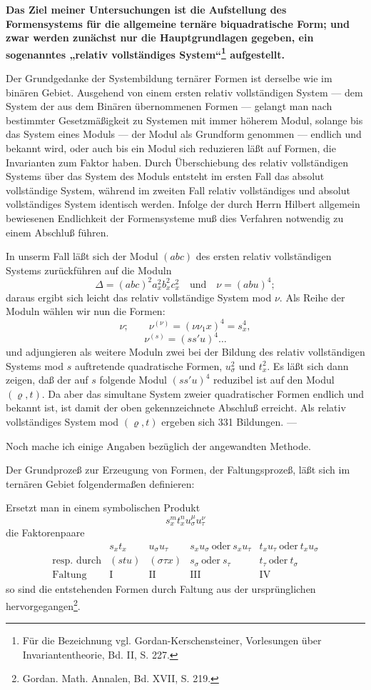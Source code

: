 \documentclass[11pt]{article}
\begin{document}
\textbf{Das Ziel meiner Untersuchungen ist die Aufstellung des Formensystems für die allgemeine ternäre biquadratische Form; und zwar werden zunächst nur die Hauptgrundlagen gegeben, ein sogenanntes „relativ vollständiges System“\footnote{Für die Bezeichnung vgl. Gordan-Kerschensteiner, Vorlesungen über Invariantentheorie, Bd. II, S. 227.} aufgestellt.}

Der Grundgedanke der Systembildung ternärer Formen ist derselbe wie im binären Gebiet. Ausgehend von einem ersten relativ vollständigen System --- dem System der aus dem Binären übernommenen Formen --- gelangt man nach bestimmter Gesetzmäßigkeit zu Systemen mit immer höherem Modul, solange bis das System eines Moduls --- der Modul als Grundform genommen --- endlich und bekannt wird, oder auch bis ein Modul sich reduzieren läßt auf Formen, die Invarianten zum Faktor haben. Durch Überschiebung des relativ vollständigen Systems über das System des Moduls entsteht im ersten Fall das absolut vollständige System, während im zweiten Fall relativ vollständiges und absolut vollständiges System identisch werden. Infolge der durch Herrn Hilbert allgemein bewiesenen Endlichkeit der Formensysteme muß dies Verfahren notwendig zu einem Abschluß führen.

In unserm Fall läßt sich der Modul $(abc)$ des ersten relativ vollständigen Systems zurückführen auf die Moduln
\[
\Delta=(abc)^2a_x^2b_x^2c_x^2\quad\text{und}\quad \nu=(abu)^4;
\]
daraus ergibt sich leicht das relativ vollständige System mod $\nu$. Als Reihe der Moduln wählen wir nun die Formen:
\[
\nu;\qquad \nu^{(\nu)}=(\nu\nu_1x)^4=s_x^4,
\]
\[
\nu^{(s)}=(ss'u)^4\ldots
\]
und adjungieren als weitere Moduln zwei bei der Bildung des relativ vollständigen Systems mod $s$ auftretende quadratische Formen, $u_\sigma^2$ und $t_x^2$. Es läßt sich dann zeigen, daß der auf $s$ folgende Modul $(ss'u)^4$ reduzibel ist auf den Modul $(\varrho,t)$. Da aber das simultane System zweier quadratischer Formen endlich und bekannt ist, ist damit der oben gekennzeichnete Abschluß erreicht. Als relativ vollständiges System mod $(\varrho,t)$ ergeben sich 331 Bildungen. ---

Noch mache ich einige Angaben bezüglich der angewandten Methode.

Der Grundprozeß zur Erzeugung von Formen, der Faltungsprozeß, läßt sich im ternären Gebiet folgendermaßen definieren:

Ersetzt man in einem symbolischen Produkt
\[
s_x^m t_x^n u_\sigma^\mu u_\tau^\nu
\]
die Faktorenpaare
\[
\begin{array}{c|c|c|c|c}
 & s_xt_x & u_\sigma u_\tau & s_xu_\sigma\ \text{oder}\ s_xu_\tau & t_xu_\tau\ \text{oder}\ t_xu_\sigma\\
\text{resp. durch} & (stu) & (\sigma\tau x) & s_\sigma\ \text{oder}\ s_\tau & t_\tau\ \text{oder}\ t_\sigma\\
\text{Faltung} & \mathrm{I} & \mathrm{II} & \mathrm{III} & \mathrm{IV}
\end{array}
\]
so sind die entstehenden Formen durch Faltung aus der ursprünglichen hervorgegangen\footnote{Gordan. Math. Annalen, Bd. XVII, S. 219.}.
\end{document}
